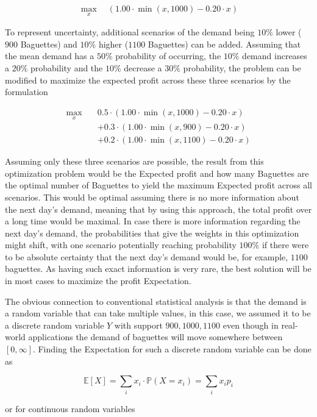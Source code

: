 \documentclass[preprint,12pt]{elsarticle}
\begin{document}
\begin{align*}
	\max_{x} \quad \left( 1.00 \cdot \min(x,1000) - 0.20 \cdot x \right)
\end{align*}


To represent uncertainty, additional scenarios of the demand being $10\%$ lower ($900$ Baguettes) and $10\%$ higher ($1100$ Baguettes) can be added. Assuming that the mean demand has a $50\%$ probability of occurring, the $10\%$ demand increases a $20\%$ probability and the $10\%$ decrease a $30\%$  probability, the problem can be modified to maximize the expected profit across these three scenarios by the formulation

\begin{align*}
	\max_{x} \quad & 0.5 \cdot \left(1.00 \cdot \min(x,1000) - 0.20 \cdot x \right) \\
	&+ 0.3 \cdot \left(1.00 \cdot \min(x,900) - 0.20 \cdot x\right) \\
	&+ 0.2 \cdot \left(1.00 \cdot \min(x,1100) - 0.20 \cdot x\right)
\end{align*}

Assuming only these three scenarios are possible, the result from this optimization problem would be the Expected profit and how many Baguettes are the optimal number of Baguettes to yield the maximum Expected profit across all scenarios. This would be optimal assuming there is no more information about the next day's demand, meaning that by using this approach, the total profit over a long time would be maximal. In case there is more information regarding the next day's demand, the probabilities that give the weights in this optimization might shift, with one scenario potentially reaching probability $100\%$ if there were to be absolute certainty that the next day's demand would be, for example, $1100$ baguettes. As having such exact information is very rare, the best solution will be in most cases to maximize the profit Expectation. 

The obvious connection to conventional statistical analysis is that the demand is a random variable that can take multiple values, in this case, we assumed it to be a discrete random variable $Y$ with support ${900,1000,1100}$ even though in real-world applications the demand of baguettes will move somewhere between $[0,\infty]$. Finding the Expectation for such a discrete random variable can be done as 

\[
\mathbb{E}[X] = \sum_{i} x_i \cdot \mathbb{P}(X = x_i) = \sum_{i} x_i p_i
\]

or for continuous random variables  
\end{document}
